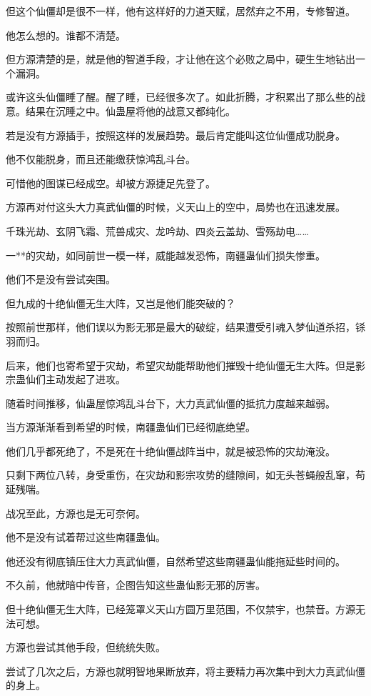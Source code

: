 \begin{this_body}
但这个仙僵却是很不一样，他有这样好的力道天赋，居然弃之不用，专修智道。

他怎么想的。谁都不清楚。

但方源清楚的是，就是他的智道手段，才让他在这个必败之局中，硬生生地钻出一个漏洞。

或许这头仙僵睡了醒。醒了睡，已经很多次了。如此折腾，才积累出了那么些的战意。结果在沉睡之中。仙蛊屋将他的战意又都纯化。

若是没有方源插手，按照这样的发展趋势。最后肯定能叫这位仙僵成功脱身。

他不仅能脱身，而且还能缴获惊鸿乱斗台。

可惜他的图谋已经成空。却被方源捷足先登了。

方源再对付这头大力真武仙僵的时候，义天山上的空中，局势也在迅速发展。

千珠光劫、玄阴飞霜、荒兽成灾、龙吟劫、四炎云盖劫、雪殇劫电……

一**的灾劫，如同前世一模一样，威能越发恐怖，南疆蛊仙们损失惨重。

他们不是没有尝试突围。

但九成的十绝仙僵无生大阵，又岂是他们能突破的？

按照前世那样，他们误以为影无邪是最大的破绽，结果遭受引魂入梦仙道杀招，铩羽而归。

后来，他们也寄希望于灾劫，希望灾劫能帮助他们摧毁十绝仙僵无生大阵。但是影宗蛊仙们主动发起了进攻。

随着时间推移，仙蛊屋惊鸿乱斗台下，大力真武仙僵的抵抗力度越来越弱。

当方源渐渐看到希望的时候，南疆蛊仙们已经彻底绝望。

他们几乎都死绝了，不是死在十绝仙僵战阵当中，就是被恐怖的灾劫淹没。

只剩下两位八转，身受重伤，在灾劫和影宗攻势的缝隙间，如无头苍蝇般乱窜，苟延残喘。

战况至此，方源也是无可奈何。

他不是没有试着帮过这些南疆蛊仙。

他还没有彻底镇压住大力真武仙僵，自然希望这些南疆蛊仙能拖延些时间的。

不久前，他就暗中传音，企图告知这些蛊仙影无邪的厉害。

但十绝仙僵无生大阵，已经笼罩义天山方圆万里范围，不仅禁宇，也禁音。方源无法可想。

方源也尝试其他手段，但统统失败。

尝试了几次之后，方源也就明智地果断放弃，将主要精力再次集中到大力真武仙僵的身上。


\end{this_body}
